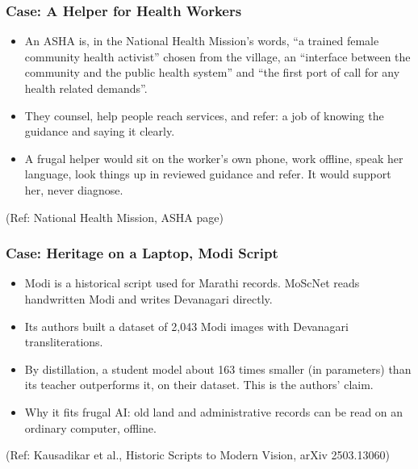 \begin{frame}[fragile]\frametitle{Case: A Helper for Health Workers}
\begin{itemize}
\item An ASHA is, in the National Health Mission's words, ``a trained female community health activist'' chosen from the village, an ``interface between the community and the public health system'' and ``the first port of call for any health related demands''.
\item They counsel, help people reach services, and refer: a job of knowing the guidance and saying it clearly.
\item A frugal helper would sit on the worker's own phone, work offline, speak her language, look things up in reviewed guidance and refer. It would support her, never diagnose.
\end{itemize}
{\tiny (Ref: National Health Mission, ASHA page)}
\end{frame}

\begin{frame}[fragile]\frametitle{Case: Heritage on a Laptop, Modi Script}
\begin{itemize}
\item Modi is a historical script used for Marathi records. MoScNet reads handwritten Modi and writes Devanagari directly.
\item Its authors built a dataset of 2,043 Modi images with Devanagari transliterations.
\item By distillation, a student model about 163 times smaller (in parameters) than its teacher outperforms it, on their dataset. This is the authors' claim.
\item Why it fits frugal AI: old land and administrative records can be read on an ordinary computer, offline.
\end{itemize}
{\tiny (Ref: Kausadikar et al., Historic Scripts to Modern Vision, arXiv 2503.13060)}
\end{frame}

